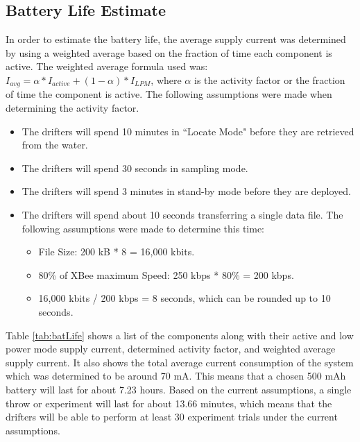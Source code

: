 \subsection{Battery Life Estimate}
In order to estimate the battery life, the average supply current was determined by using a weighted average based on the fraction of time each component is active.  The weighted average formula used was: $I_{avg} = \alpha * I_{active} + (1 - \alpha) * I_{LPM}$, where $\alpha$ is the activity factor or the fraction of time the component is active.  The following assumptions were made when determining the activity factor.

\begin{itemize}
\item The drifters will spend 10 minutes in ``Locate Mode" before they are retrieved from the water.
\item The drifters will spend 30 seconds in sampling mode.
\item The drifters will spend 3 minutes in stand-by mode before they are deployed.
\item The drifters will spend about 10 seconds transferring a single data file.  The following assumptions were made to determine this time:
	\begin{itemize}
		\item File Size: 200 kB * 8 = 16,000 kbits.
		\item 80\% of XBee maximum Speed: 250 kbps * 80\% = 200 kbps.
		\item 16,000 kbits / 200 kbps = 8 seconds, which can be rounded up to 10 seconds.
	\end{itemize}
\end{itemize}


Table \ref{tab:batLife} shows a list of the components along with their active and low power mode supply current, determined activity factor, and weighted average supply current.  It also shows the total average current consumption of the system which was determined to be  around 70 mA.  This means that a chosen 500 mAh battery will last for about 7.23 hours.  Based on the current assumptions, a single throw or experiment will last for about 13.66 minutes, which means that the drifters will be able to perform at least 30 experiment trials under the current assumptions.

